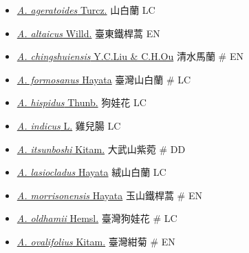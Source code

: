 \begin{itemize}
  \begin{itemize}
        \item[] \href{http://www.theplantlist.org/tpl1.1/search?q=Aster+ageratoides}{\textit{A. ageratoides} Turcz.}   山白蘭   LC
        \item[] \href{http://www.theplantlist.org/tpl1.1/search?q=Aster+altaicus}{\textit{A. altaicus} Willd.}   臺東鐵桿蒿   EN
        \item[] \href{http://www.theplantlist.org/tpl1.1/search?q=Aster+chingshuiensis}{\textit{A. chingshuiensis} Y.C.Liu \& C.H.Ou}   清水馬蘭  \# EN
        \item[] \href{http://www.theplantlist.org/tpl1.1/search?q=Aster+formosanus}{\textit{A. formosanus} Hayata}   臺灣山白蘭  \# LC
        \item[] \href{http://www.theplantlist.org/tpl1.1/search?q=Aster+hispidus}{\textit{A. hispidus} Thunb.}   狗娃花   LC
        \item[] \href{http://www.theplantlist.org/tpl1.1/search?q=Aster+indicus}{\textit{A. indicus} L.}   雞兒腸   LC
        \item[] \href{http://www.theplantlist.org/tpl1.1/search?q=Aster+itsunboshi}{\textit{A. itsunboshi} Kitam.}   大武山紫菀  \# DD
        \item[] \href{http://www.theplantlist.org/tpl1.1/search?q=Aster+lasiocladus}{\textit{A. lasiocladus} Hayata}   絨山白蘭   LC
        \item[] \href{http://www.theplantlist.org/tpl1.1/search?q=Aster+morrisonensis}{\textit{A. morrisonensis} Hayata}   玉山鐵桿蒿  \# EN
        \item[] \href{http://www.theplantlist.org/tpl1.1/search?q=Aster+oldhamii}{\textit{A. oldhamii} Hemsl.}   臺灣狗娃花  \# LC
        \item[] \href{http://www.theplantlist.org/tpl1.1/search?q=Aster+ovalifolius}{\textit{A. ovalifolius} Kitam.}   臺灣紺菊  \# EN

\end{itemize}
\end{itemize}
